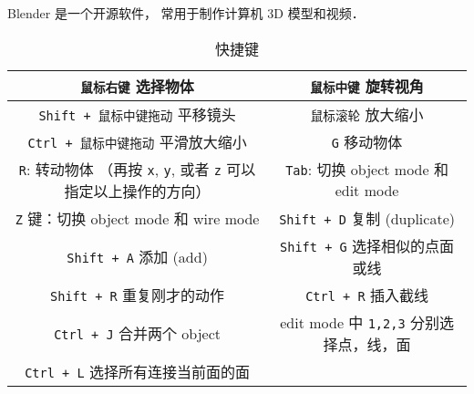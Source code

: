 
\begin{issues}
\issueDraft
\end{issues}

Blender 是一个开源软件， 常用于制作计算机 3D 模型和视频．

\begin{table}[ht]
\centering
\caption{快捷键}\label{Blendr_tab1}
\begin{tabular}{|c|c|}
\hline
\verb|鼠标右键| 选择物体 & \verb|鼠标中键| 旋转视角 \\
\hline
\verb|Shift + 鼠标中键拖动| 平移镜头 & \verb|鼠标滚轮| 放大缩小 \\
\hline
\verb|Ctrl + 鼠标中键拖动| 平滑放大缩小 & \verb|G| 移动物体 \\
\hline
\verb|R|: 转动物体 （再按 \verb|x|, \verb|y|, 或者 \verb|z| 可以指定以上操作的方向） & \verb|Tab|: 切换 object mode 和 edit mode \\
\hline
\verb|Z| 键：切换 object mode 和 wire mode & \verb|Shift + D| 复制 (duplicate) \\
\hline
\verb|Shift + A| 添加 (add) & \verb|Shift + G| 选择相似的点面或线 \\
\hline
\verb|Shift + R| 重复刚才的动作 & \verb|Ctrl + R| 插入截线 \\
\hline
\verb|Ctrl + J| 合并两个 object & edit mode 中 \verb|1,2,3| 分别选择点，线，面\\
\hline
\verb|Ctrl + L| 选择所有连接当前面的面 & 
\end{tabular}
\end{table}
